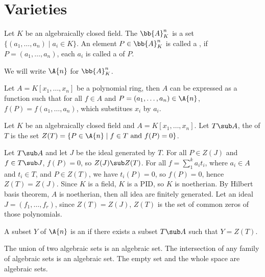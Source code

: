 \documentclass[10pt]{article}
\begin{document}
\def\htitle{Algebraic Geometry}
\def\hauthor{Hassium}
\hsetup
\htoc
\hmain
\section{Varieties}
\begin{definition}
    Let $K$ be an algebraically closed field. The  ${\bb{A}}_{K}^{n}$ is a set $\{({a}_{1},\dots,{a}_{n})\mid{a}_{i}\in K\}$. An element $P\in{\bb{A}}_{K}^{n}$ is called a , if $P=({a}_{1},\dots,{a}_{n})$, each ${a}_{i}$ is called a  of $P$.
\end{definition}
\begin{remark}
    We will write $\A{n}$ for ${\bb{A}}_{K}^{n}$.
\end{remark}
\par
Let $A=K[{x}_{1},\dots,{x}_{n}]$ be a polynomial ring, then $A$ can be expressed as a function such that for all $f\in A$ and $P=({a}_{1},\dots,{a}_{n})\in\A{n}$, $f(P)=f({a}_{1},\dots,{a}_{n})$, which substitues ${x}_{i}$ by ${a}_{i}$. 
\begin{definition}
    Let $K$ be an algebraically closed field and $A=K[{x}_{1},\dots,{x}_{n}]$. Let $T\sub A$, the  of $T$ is the set $Z(T)=\{P\in\A{n}\mid f\in T\ \text{and}\ f(P)=0\}$.
\end{definition}
\par
Let $T\sub A$ and let $J$ be the ideal generated by $T$. For all $P\in Z(J)$ and $f\in T\sub J$, $f(P)=0$, so $Z(J)\sub Z(T)$. For all $f={\sum}_{1}^{k}{a}_{i}{t}_{i}$, where ${a}_{i}\in A$ and ${t}_{i}\in T$, and $P\in Z(T)$, we have ${t}_{i}(P)=0$, so $f(P)=0$, hence $Z(T)=Z(J)$. Since $K$ is a field, $K$ is a PID, so $K$ is noetherian. By Hilbert basis theorem, $A$ is noetherian, then all idea are finitely generated. Let an ideal $J=({f}_{1},\dots,{f}_{r})$, since $Z(T)=Z(J)$, $Z(T)$ is the set of common zeros of those polynomials.
\begin{definition}
    A subset $Y$ of $\A{n}$ is an  if there exists a subset $T\sub A$ such that $Y=Z(T)$.
\end{definition}
\begin{proposition}
    The union of two algebraic sets is an algebraic set. The intersection of any family of algebraic sets is an algebraic set. The empty set and the whole space are algebraic sets.
\end{proposition}
\end{document}
